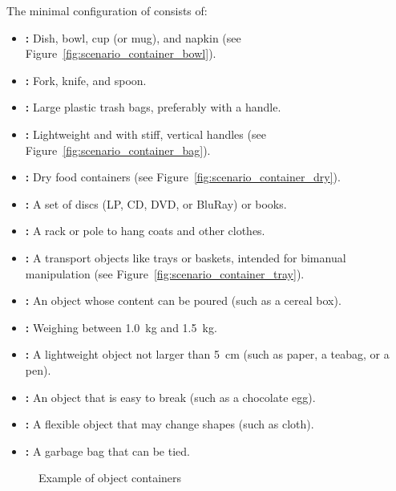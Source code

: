 The minimal configuration of \KnownObjects{} consists of:
\begin{itemize}
	\item \textbf{:} Dish, bowl, cup (or mug), and napkin (see Figure~\ref{fig:scenario_container_bowl}).
	\item \textbf{:} Fork, knife, and spoon.
	\item \textbf{:} Large plastic trash bags, preferably with a handle.
	\item \textbf{:} Lightweight and with stiff, vertical handles (see Figure~\ref{fig:scenario_container_bag}).
	\item \textbf{:} Dry food containers (see Figure~\ref{fig:scenario_container_dry}).
	\item \textbf{:} A set of discs (LP, CD, DVD, or BluRay) or books.
	\item \textbf{:} A rack or pole to hang coats and other clothes.
	\item \textbf{:} A transport objects like trays or baskets, intended for bimanual manipulation (see Figure~\ref{fig:scenario_container_tray}).
	\item \textbf{:} An object whose content can be poured (such as a cereal box).
	\item \textbf{:} Weighing between \SI{1.0}{\kg} and \SI{1.5}{\kg}.
	\item \textbf{:} A lightweight object not larger than \SI{5}{\centi\meter} (such as paper, a teabag, or a pen).
	\item \textbf{:} An object that is easy to break (such as a chocolate egg).
	\item \textbf{:} A flexible object that may change shapes (such as cloth).
	\item \textbf{:} A garbage bag that can be tied.
\end{itemize}

\begin{figure}[H]
	\centering
	\caption{Example of object containers}
	\label{fig:scenario_containers}
\end{figure}

